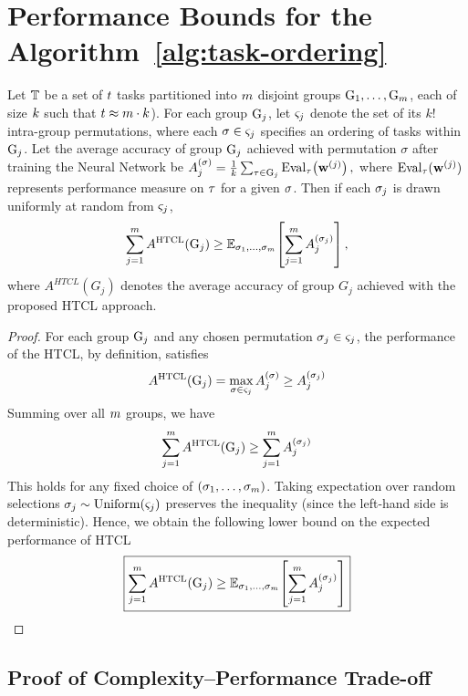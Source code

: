 \section{Performance Bounds for the Algorithm~\ref{alg:task-ordering}}
\label{app:performance-bounds}

\begin{theorem}
\label{prop:group_vs_random}
Let $\mathbb{T}$ be a set of $t$ tasks partitioned into $m$ disjoint groups $\mathrm{G}_1, \ldots, \mathrm{G}_m$, each of size $k$ such that  $t \approx m \cdot k$). %
For each group $\mathrm{G}_j$, let $\varsigma_j$ denote the set of its $k!$ intra-group permutations, where each $\sigma \in \varsigma_j$ specifies an ordering of tasks within $\mathrm{G}_j$. Let the average accuracy of group $\mathrm{G}_j$ achieved with permutation $\sigma$ after training the Neural Network be
$A_j^{(\sigma)} = \frac{1}{k} \sum_{\tau \in \mathrm{G}_j} \mathrm{Eval}_{\tau}\!\left(\mathbf{w}^{(j)}\right),$
where $\mathrm{Eval}_{\tau}(\mathbf{w}^{(j)})$ represents performance measure on $\tau$ for a given $\sigma$. %
    Then if each $\sigma_j$ is drawn uniformly at random from $\varsigma_j$,
    \[
    \sum_{j=1}^{m} A^{\mathrm{HTCL}}(\mathrm{G}_j) \geq \mathbb{E}_{\sigma_1, \ldots, \sigma_m}\!\left[\sum_{j=1}^{m} A_j^{(\sigma_j)}\right],
    \]
    where $A^{HTCL}(G_j)$ denotes the average accuracy of group $G_j$ achieved with the proposed HTCL approach.
\end{theorem}

\begin{proof}
For each group $\mathrm{G}_j$ and any chosen permutation $\sigma_j \in \varsigma_j$, the performance of the HTCL, by definition, satisfies
\[
A^{\mathrm{HTCL}}(\mathrm{G}_j) = \max_{\sigma \in \varsigma_j} A_j^{(\sigma)} \geq A_j^{(\sigma_j)}
\]
Summing over all $m$ groups, we have
\[
\sum_{j=1}^{m} A^{\mathrm{HTCL}}(\mathrm{G}_j) \geq \sum_{j=1}^{m} A_j^{(\sigma_j)}
\]
This holds for any fixed choice of $(\sigma_1, \ldots, \sigma_m)$. Taking expectation over random selections $\sigma_j \sim \mathrm{Uniform}(\varsigma_j)$ preserves the inequality (since the left-hand side is deterministic). Hence, we obtain the following lower bound on the expected performance of HTCL
\[
\boxed{\sum_{j=1}^{m} A^{\mathrm{HTCL}}(\mathrm{G}_j) \geq \mathbb{E}_{\sigma_1, \ldots, \sigma_m}\!\left[\sum_{j=1}^{m} A_j^{(\sigma_j)}\right]}
\]

\end{proof}

\subsection{Proof of Complexity--Performance Trade-off}
\label{app:proof_tradeoff}

